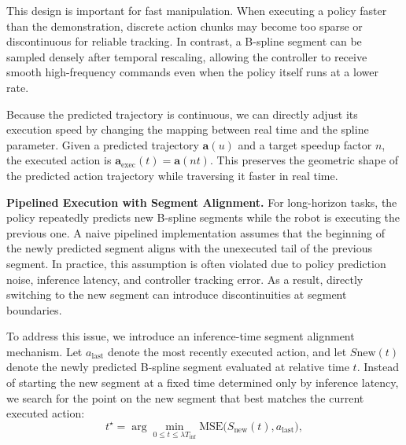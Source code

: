 This design is important for fast manipulation. When executing a policy faster than the demonstration, discrete action chunks may become too sparse or discontinuous for reliable tracking. In contrast, a B-spline segment can be sampled densely after temporal rescaling, allowing the controller to receive smooth high-frequency commands even when the policy itself runs at a lower rate.

Because the predicted trajectory is continuous, we can directly adjust its execution speed by changing the mapping between real time and the spline parameter. Given a predicted trajectory $\mathbf{a}(u)$ and a target speedup factor $n$, the executed action is $\mathbf{a}_{\mathrm{exec}}(t) = \mathbf{a}(nt)$. This preserves the geometric shape of the predicted action trajectory while traversing it faster in real time.




\noindent\textbf{Pipelined Execution with Segment Alignment.}
For long-horizon tasks, the policy repeatedly predicts new B-spline segments while the robot is executing the previous one. A naive pipelined implementation assumes that the beginning of the newly predicted segment aligns with the unexecuted tail of the previous segment. In practice, this assumption is often violated due to policy prediction noise, inference latency, and controller tracking error. As a result, directly switching to the new segment can introduce discontinuities at segment boundaries.

To address this issue, we introduce an inference-time segment alignment mechanism. Let $a_{\text{last}}$ denote the most recently executed action, and let $S{\mathrm{new}}(t)$ denote the newly predicted B-spline segment evaluated at relative time $t$. Instead of starting the new segment at a fixed time determined only by inference latency, we search for the point on the new segment that best matches the current executed action:
\begin{equation}
\label{eq:align-time}
t^\star = \arg\min_{0 \leq t \leq \lambda T_{\mathrm{inf}}}
\mathrm{MSE}\big(S_{\mathrm{new}}(t), a_{\text{last}}\big),
\end{equation}

